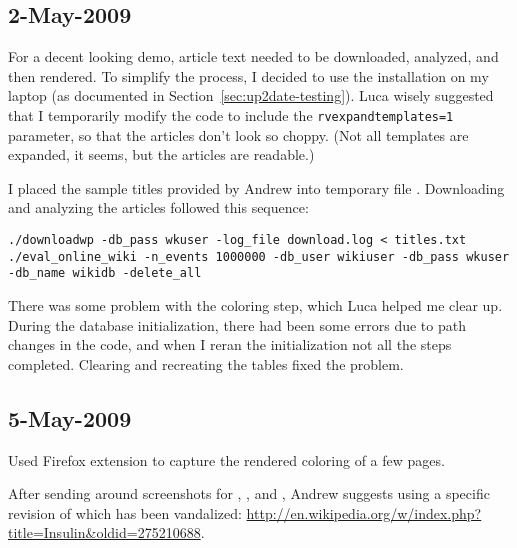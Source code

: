 \subsection{2-May-2009}

For a decent looking demo, article text needed to be downloaded,
analyzed, and then rendered.
To simplify the process, I decided to use the \mediawiki installation
on my laptop (as documented in Section~\ref{sec:up2date-testing}).
Luca wisely suggested that I temporarily modify the code to include
the \texttt{rvexpandtemplates=1} parameter, so that the articles
don't look so choppy.
(Not all templates are expanded, it seems, but the articles
are readable.)

I placed the sample titles provided by Andrew into temporary
file .
Downloading and analyzing the articles followed this sequence:
\begin{verbatim}
./downloadwp -db_pass wkuser -log_file download.log < titles.txt 
./eval_online_wiki -n_events 1000000 -db_user wikiuser -db_pass wkuser -db_name wikidb -delete_all
\end{verbatim}

There was some problem with the coloring step, which Luca helped me clear up.
During the database initialization, there had been some errors due
to path changes in the code, and when I reran the initialization
not all the steps completed.
Clearing and recreating the \wikitrust tables fixed the problem.

\subsection{5-May-2009}

Used Firefox extension  to capture
the rendered coloring of a few pages.

After sending around screenshots for ,
, and ,
Andrew suggests using a specific revision of 
which has been vandalized:
\url{http://en.wikipedia.org/w/index.php?title=Insulin&oldid=275210688}.

